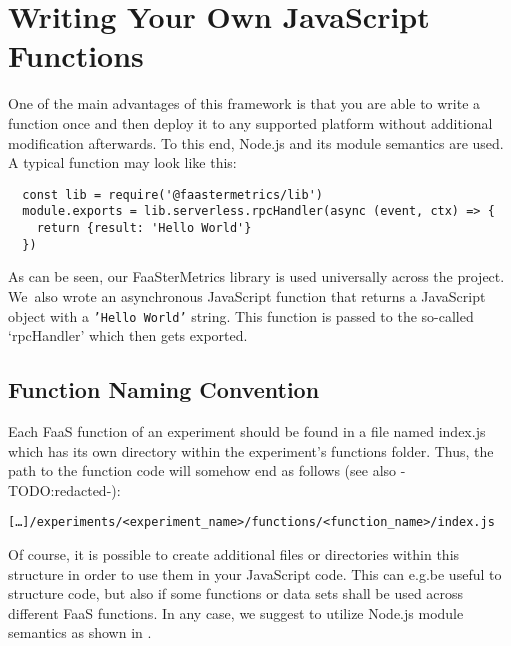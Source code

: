 \documentclass[../main.tex]{subfiles}
\begin{document}
\section{Writing Your Own JavaScript Functions}\label{sec:jsFunctions}

One of the main advantages of this framework is that you are able to write a function once 
and then deploy it to any supported platform without additional modification afterwards.
To this end, Node.js and its module semantics are used. A typical function may look like this:

\begin{tcolorbox}
\begin{verbatim}
  const lib = require('@faastermetrics/lib')
  module.exports = lib.serverless.rpcHandler(async (event, ctx) => {
    return {result: 'Hello World'}
  })
\end{verbatim}
\end{tcolorbox}

As can be seen, our FaaSterMetrics library is used universally across the project. 
We~also wrote an asynchronous JavaScript function that returns a JavaScript object with a \texttt{'Hello World'} string. 
This function is passed to the so-called `rpcHandler' which then gets exported. 

\subsection{Function Naming Convention}

Each FaaS function of an experiment should be found in a file named index.js which has its own directory within the experiment's functions folder.
Thus, the path to the function code will somehow end as follows (see also -TODO:\@ redacted-):

\begin{tcolorbox}
  \texttt{[\ldots]/experiments/<experiment\_name>/functions/<function\_name>/index.js}
\end{tcolorbox}

Of course, it is possible to create additional files or directories within this structure in order to use them in your JavaScript code.
This can e.g.\@ be useful to structure code, but also if some functions or data sets shall be used across different FaaS functions.
In any case, we suggest to utilize Node.js module semantics as shown in .
\end{document}
